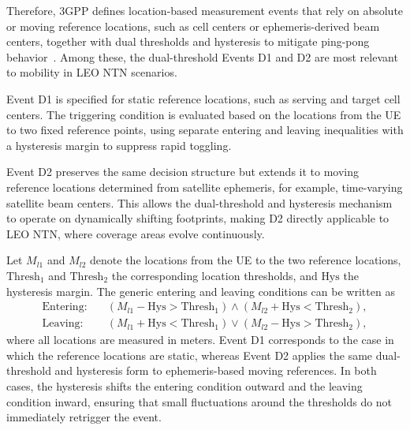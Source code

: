 Therefore, 3GPP defines location-based measurement events that rely on absolute or moving reference locations, such as cell centers or ephemeris-derived beam centers, together with dual thresholds and hysteresis to mitigate ping-pong behavior~\cite{rel_38331}. Among these, the dual-threshold Events D1 and D2 are most relevant to mobility in LEO NTN scenarios.

Event D1 is specified for static reference locations, such as serving and target cell centers. The triggering condition is evaluated based on the locations from the UE to two fixed reference points, using separate entering and leaving inequalities with a hysteresis margin to suppress rapid toggling. 

Event D2 preserves the same decision structure but extends it to moving reference locations determined from satellite ephemeris, for example, time-varying satellite beam centers. This allows the dual-threshold and hysteresis mechanism to operate on dynamically shifting footprints, making D2 directly applicable to LEO NTN, where coverage areas evolve continuously.

Let $M_{l1}$ and $M_{l2}$ denote the locations from the UE to the two reference locations, $\text{Thresh}_1$ and $\text{Thresh}_2$ the corresponding location thresholds, and $\text{Hys}$ the hysteresis margin. The generic entering and leaving conditions can be written as
\begin{align}
    \text{Entering}:&\quad (M_{l1} - \text{Hys} > \text{Thresh}_1) \land (M_{l2} + \text{Hys} < \text{Thresh}_2),\\
    \text{Leaving}:&\quad (M_{l1} + \text{Hys} < \text{Thresh}_1) \lor (M_{l2} - \text{Hys} > \text{Thresh}_2),
\end{align}
where all locations are measured in meters. Event D1 corresponds to the case in which the reference locations are static, whereas Event D2 applies the same dual-threshold and hysteresis form to ephemeris-based moving references. In both cases, the hysteresis shifts the entering condition outward and the leaving condition inward, ensuring that small fluctuations around the thresholds do not immediately retrigger the event.

